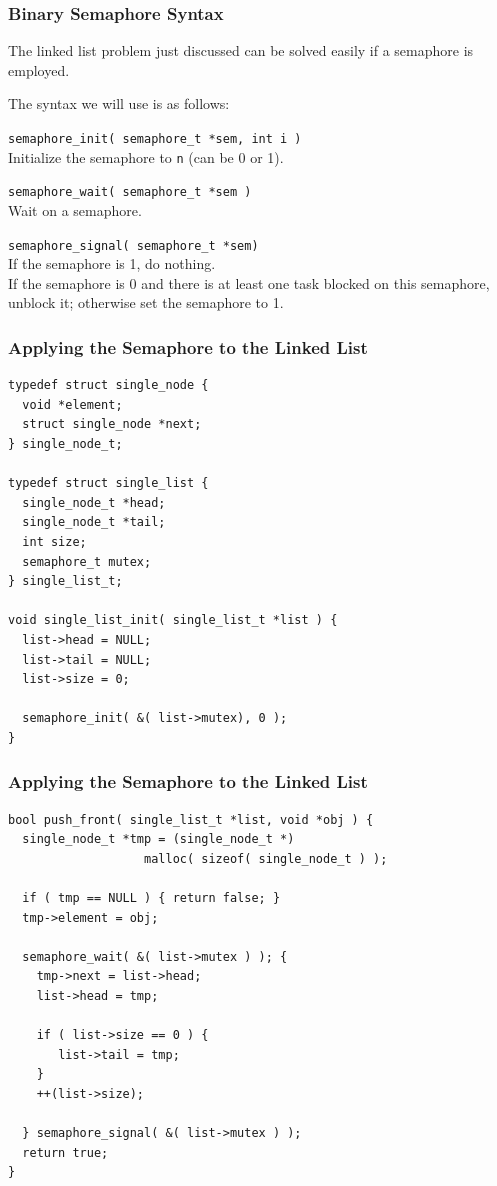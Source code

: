 \begin{frame}
\frametitle{Binary Semaphore Syntax}

The linked list problem just discussed can be solved easily if a semaphore is employed. 

The syntax we will use is as follows:

\texttt{semaphore\_init( semaphore\_t *sem, int i )}\\
Initialize the semaphore to \texttt{n} (can be 0 or 1).

\texttt{semaphore\_wait( semaphore\_t *sem )}\\
Wait on a semaphore.

\texttt{semaphore\_signal( semaphore\_t *sem)}\\
If the semaphore is 1, do nothing.\\
If the semaphore is 0 and there is at least one task blocked on this semaphore, unblock it; otherwise set the semaphore to 1.

\end{frame}

\begin{frame}[fragile]
\frametitle{Applying the Semaphore to the Linked List}

\begin{verbatim}
typedef struct single_node {
  void *element;
  struct single_node *next;
} single_node_t;

typedef struct single_list {
  single_node_t *head;
  single_node_t *tail;
  int size;
  semaphore_t mutex;
} single_list_t;

void single_list_init( single_list_t *list ) {
  list->head = NULL;
  list->tail = NULL;
  list->size = 0;

  semaphore_init( &( list->mutex), 0 );
}
\end{verbatim}

\end{frame}

\begin{frame}[fragile]
\frametitle{Applying the Semaphore to the Linked List}

\begin{verbatim}
bool push_front( single_list_t *list, void *obj ) {
  single_node_t *tmp = (single_node_t *) 
                   malloc( sizeof( single_node_t ) );
  
  if ( tmp == NULL ) { return false; }  
  tmp->element = obj;

  semaphore_wait( &( list->mutex ) ); {  
    tmp->next = list->head;
    list->head = tmp;

    if ( list->size == 0 ) {
       list->tail = tmp;
    }
    ++(list->size);
  
  } semaphore_signal( &( list->mutex ) );
  return true;
}
\end{verbatim}


\end{frame}

